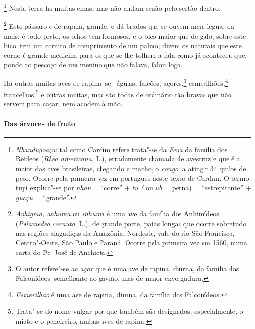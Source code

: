 \footnote{ \textit{Nhandugoaçu}: tal como Cardim
refere trata"-se da \textit{Ema} da família dos Reídeos (\textit{Rhea
americana}, L.), erradamente chamada de avestruz e que é a maior das aves
brasileiras, chegando o macho, o \textit{congo}, a atingir 34 quilos de
peso. Ocorre pela primeira vez em português neste texto de Cardim. O
termo tupi explica"-se por \textit{nhan} = ``corre'' + \textit{tu (} ou
\textit{ub} = perna) = ``estrepitante'' + \textit{guaçu} = ``grande''.} 
Nesta terra há muitas emas, mas não andam senão pelo sertão dentro. 

\footnote{ \textit{Anhigma, anhuma} ou \textit{inhuma}
é uma ave da família dos Anhimídeos (\textit{Palamedea cornuta}, L.), 
de grande porte, patas longas que ocorre sobretudo nas regiões
alagadiças da Amazônia, Nordeste, vale do rio São Francisco,
Centro"-Oeste, São Paulo e Paraná. Ocorre pela primeira vez em 1560,
numa carta do Pe. José de Anchieta.} Este pássaro
é de rapina, grande, e dá brados que se ouvem meia légua, ou mais; é
todo preto, os olhos tem formosos, e o bico maior que de galo, sobre
este \mbox{bico tem} um cornito de comprimento de um palmo; dizem os naturais
que este corno é grande medicina para os que se lhe tolhem a fala como
já aconteceu que, pondo ao pescoço de um menino que não falava, falou logo.

 Há outras muitas aves de rapina, sc.~águias, falcões, 
açores,\footnote{ O autor refere"-se ao \textit{açor} que é uma ave de rapina,
diurna, da família dos Falconídeos, semelhante ao gavião, mas de maior
envergadura.} esmerilhões,\footnote{ \textit{Esmerilhão} é uma ave
de rapina, diurna, da família dos Falconídeos.} 
francelhos,\footnote{ Trata"-se do nome vulgar por que também são designados, especialmente, o
mioto e o peneireiro, ambas aves de rapina.} e outras muitas, mas são
todas de ordinário tão bravas que não servem para caçar, nem acodem à mão.

\paragraph{Das árvores de fruto}

